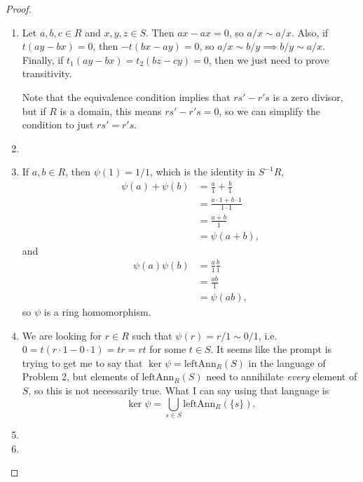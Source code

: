 \documentclass[12pt]{article}
\theoremstyle{definition}
\begin{document}
\begin{proof}\
	\begin{enumerate}[label=(\alph*)]
		\item Let $a, b, c \in R$ and $x, y, z \in S$.
		      Then $ax - ax = 0$, so $a/x \sim a/x$.
		      Also, if $t(ay - bx) = 0$, then $-t(bx - ay) = 0$, so $a/x \sim b/y \implies b/y \sim a/x$.
          Finally, if $t_1(ay - bx) = t_2(bz - cy) = 0$, then we just need to prove transitivity.

		      Note that the equivalence condition implies that $rs'-r's$ is a zero divisor, but if $R$ is a domain, this means $rs'-r's=0$, so we can simplify the condition to just $rs'=r's$.
		\item
		\item If $a, b \in R$, then $\psi(1) = 1/1$, which is the identity in $S^{-1}R$, \begin{align*}
			      \psi(a) + \psi(b) & = \frac{a}{1} + \frac{b}{1}              \\
			                              & = \frac{a\cdot 1 + b \cdot 1}{1 \cdot 1} \\
			                              & = \frac{a + b}{1}                        \\
			                              & = \psi(a + b),
		      \end{align*}
		      and
		      \begin{align*}
			      \psi(a)\psi(b) & = \frac{a}{1}\frac{b}{1} \\
			                           & = \frac{ab}{1}           \\
			                           & = \psi(ab),
		      \end{align*}
		      so $\psi$ is a ring homomorphism.
		\item We are looking for $r \in R$ such that $\psi(r) = r/1 \sim 0/1$, i.e. $0 = t(r\cdot 1 - 0 \cdot 1) = tr = rt$ for some $t \in S$.
		      It seems like the prompt is trying to get me to say that $\ker \psi = \mathrm{leftAnn}_R(S)$ in the language of Problem 2, but elements of $\mathrm{leftAnn}_R(S)$ need to annihilate \textit{every} element of $S$, so this is not necessarily true.
		      What I can say using that language is \begin{equation*}
            \ker \psi = \bigcup_{s \in S}\mathrm{leftAnn}_R(\lbrace s \rbrace).
		      \end{equation*}
		\item
		\item
	\end{enumerate}
\end{proof}
\end{document}
